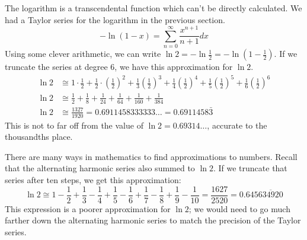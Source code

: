 \documentclass[fleqn]{report}
\begin{document}
\begin{example}
The logarithm is a transcendental function which can't
be directly calculated. We had a Taylor series for the
logarithm in the previous section.
\begin{equation*}
-\ln (1-x) = \sum_{n=0}^\infty \frac{x^{n+1}}{n+1} dx
\end{equation*}
Using some clever arithmetic, we can write $\ln 2 = - \ln
\frac{1}{2} = - \ln \left( 1 - \frac{1}{2} \right)$. If we
truncate the series at degree $6$, we have this approximation
for $\ln 2$.
\begin{align*}
\ln 2 & \cong 1 \cdot \frac{1}{2} + \frac{1}{2} \cdot \left(
\frac{1}{2} \right)^2 + \frac{1}{3} \left( \frac{1}{2}
\right)^3 + \frac{1}{4} \left( \frac{1}{2} \right)^4 +
\frac{1}{5} \left( \frac{1}{2} \right)^5 + \frac{1}{6} \left(
\frac{1}{2} \right)^6 \\
\ln 2 & \cong \frac{1}{2} + \frac{1}{8} + \frac{1}{24} +
\frac{1}{64} + \frac{1}{160} + \frac{1}{384} \\
\ln 2 & \cong \frac{1327}{1920} = 0.6911458333333 \ldots 
= 0.6911458\bar{3}
\end{align*}
This is not to far off from the value of $\ln 2 =
0.69314\ldots$, accurate to the thousandths place. 
\end{example}

\begin{example}
There are many ways in mathematics to find approximations to
numbers. Recall that the alternating harmonic series also
summed to $\ln 2$. If we truncate that series after ten
steps, we get this approximation:
\begin{equation*}
\ln 2 \cong 1 - \frac{1}{2} + \frac{1}{3} - \frac{1}{4} +
\frac{1}{5} - \frac{1}{6} + \frac{1}{7} - \frac{1}{8} +
\frac{1}{9} - \frac{1}{10} = \frac{1627}{2520} =
0.645\overline{634920}
\end{equation*}
This expression is a poorer approximation for $\ln 2$; we
would need to go much farther down the alternating harmonic
series to match the precision of the Taylor series.
\end{example}
\end{document}
